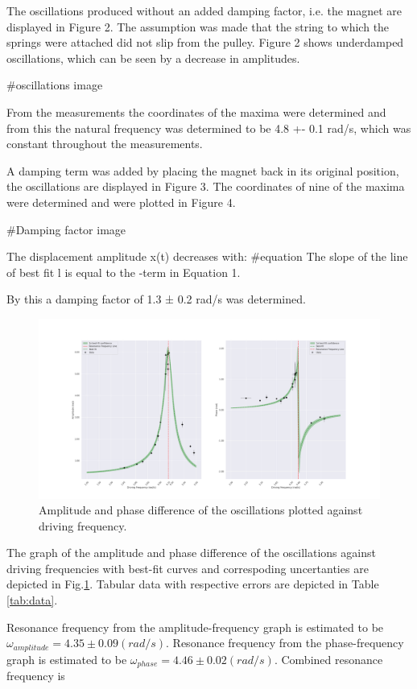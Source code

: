The oscillations produced without an added damping factor, i.e. the magnet are displayed in Figure 2. The assumption was made that the string to which the springs were attached did not slip from the pulley. Figure 2 shows underdamped oscillations, which can be seen by a decrease in amplitudes.

#oscillations image

From the measurements the coordinates of the maxima were determined and from this the natural frequency was determined to be 4.8 +- 0.1 rad/s, which was constant throughout the measurements.

A damping term was added by placing the magnet back in its original position, the oscillations are displayed in Figure 3. The coordinates of nine of the maxima were determined and were plotted in Figure 4. 

#Damping factor image

The displacement amplitude x(t) decreases with:
#equation
The slope of the line of best fit l is equal to the -\gamma term in Equation 1.

By this a damping factor of 1.3 ± 0.2 rad/s was determined.



\begin{figure}[H]
  \centering
  \includegraphics[width=1\textwidth]{oscillations/images/resonance}
  \caption{Amplitude and phase difference of the oscillations plotted against driving frequency.}
  \label{fig:resonance}
\end{figure}

The graph of the amplitude and phase difference of the oscillations against driving frequencies with best-fit curves and correspoding uncertanties are depicted in Fig.\ref{fig:resonance}. Tabular data with respective errors are depicted in Table \ref{tab:data}.

Resonance frequency from the amplitude-frequency graph is estimated to be $\omega_{amplitude} = 4.35 \pm 0.09 (rad/s)$. Resonance frequency from the phase-frequency graph is estimated to be $\omega_{phase} = 4.46 \pm 0.02 (rad/s)$. Combined resonance frequency is

